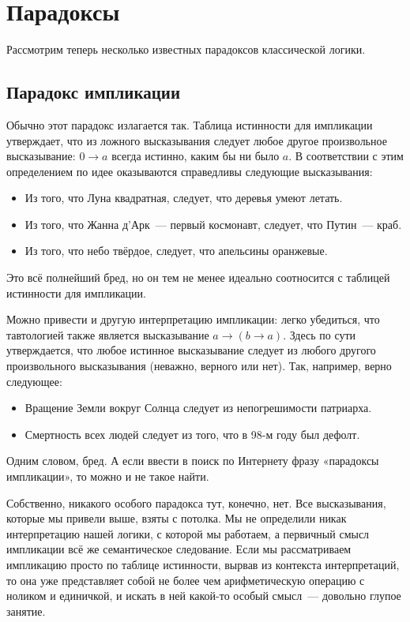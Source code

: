 \section{Парадоксы}

Рассмотрим теперь несколько известных парадоксов классической логики.

\subsection{Парадокс импликации}

Обычно этот парадокс излагается так. Таблица истинности для импликации утверждает, что из ложного высказывания следует любое другое произвольное высказывание: $0 \rightarrow a$ всегда истинно, каким бы ни было $a$. В соответствии с этим определением по идее оказываются справедливы следующие высказывания:

\begin{itemize}
\item Из того, что Луна квадратная, следует, что деревья умеют летать.
\item Из того, что Жанна д’Арк~--- первый космонавт, следует, что Путин~--- краб.
\item Из того, что небо твёрдое, следует, что апельсины оранжевые.
\end{itemize}

Это всё полнейший бред, но он тем не менее идеально соотносится с таблицей истинности для импликации.

Можно привести и другую интерпретацию импликации: легко убедиться, что тавтологией также является высказывание $a \rightarrow (b \rightarrow a)$. Здесь по сути утверждается, что любое истинное высказывание следует из любого другого произвольного высказывания (неважно, верного или нет). Так, например, верно следующее:

\begin{itemize}
\item Вращение Земли вокруг Солнца следует из непогрешимости патриарха.
\item Смертность всех людей следует из того, что в 98-м году был дефолт.
\end{itemize}

Одним словом, бред. А если ввести в поиск по Интернету фразу «парадоксы импликации», то можно и не такое найти.

Собственно, никакого особого парадокса тут, конечно, нет. Все высказывания, которые мы привели выше, взяты с потолка. Мы не определили никак интерпретацию нашей логики, с которой мы работаем, а первичный смысл импликации всё же семантическое следование. Если мы рассматриваем импликацию просто по таблице истинности, вырвав из контекста интерпретаций, то она уже представляет собой не более чем арифметическую операцию с ноликом и единичкой, и искать в ней какой-то особый смысл~--- довольно глупое занятие.

